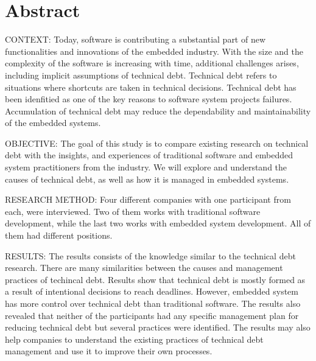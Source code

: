 
\section*{Abstract}
CONTEXT: Today, software is contributing a substantial part of new functionalities and innovations of the embedded industry. With the size and the complexity of the software is increasing with time, additional challenges arises, including implicit assumptions of technical debt. Technical debt refers to situations where shortcuts are taken in technical decisions. Technical debt has been idenfitied as one of the key reasons to software system projects failures. Accumulation of technical debt may reduce the dependability and maintainability of the embedded systems.

OBJECTIVE: The goal of this study is to compare existing research on technical debt with the insights, and experiences of traditional software and embedded system practitioners from the industry. We will explore and understand the causes of technical debt, as well as how it is managed in embedded systems.  

RESEARCH METHOD: Four different companies with one participant from each, were interviewed. Two of them works with traditional software development, while the last two works with embedded system development. All of them had different positions.

RESULTS: The results consists of the knowledge similar to the technical debt research. There are many similarities between the causes and management practices of techincal debt. Results show that technical debt is mostly formed as a result of intentional decisions to reach deadlines. However, embedded system has more control over technical debt than traditional software. The results also revealed that neither of the participants had any specific management plan for reducing technical debt but several practices were identified. The results may also help companies to understand the existing practices of technical debt management and use it to improve their own processes.